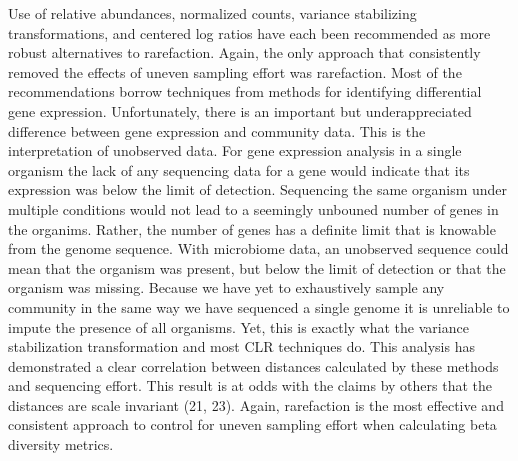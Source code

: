 \documentclass[
]{article}
\begin{document}
Use of relative abundances, normalized counts, variance stabilizing
transformations, and centered log ratios have each been recommended as
more robust alternatives to rarefaction. Again, the only approach that
consistently removed the effects of uneven sampling effort was
rarefaction. Most of the recommendations borrow techniques from methods
for identifying differential gene expression. Unfortunately, there is an
important but underappreciated difference between gene expression and
community data. This is the interpretation of unobserved data. For gene
expression analysis in a single organism the lack of any sequencing data
for a gene would indicate that its expression was below the limit of
detection. Sequencing the same organism under multiple conditions would
not lead to a seemingly unbouned number of genes in the organims.
Rather, the number of genes has a definite limit that is knowable from
the genome sequence. With microbiome data, an unobserved sequence could
mean that the organism was present, but below the limit of detection or
that the organism was missing. Because we have yet to exhaustively
sample any community in the same way we have sequenced a single genome
it is unreliable to impute the presence of all organisms. Yet, this is
exactly what the variance stabilization transformation and most CLR
techniques do. This analysis has demonstrated a clear correlation
between distances calculated by these methods and sequencing effort.
This result is at odds with the claims by others that the distances are
scale invariant (21, 23). Again, rarefaction is the most effective and
consistent approach to control for uneven sampling effort when
calculating beta diversity metrics.
\end{document}
